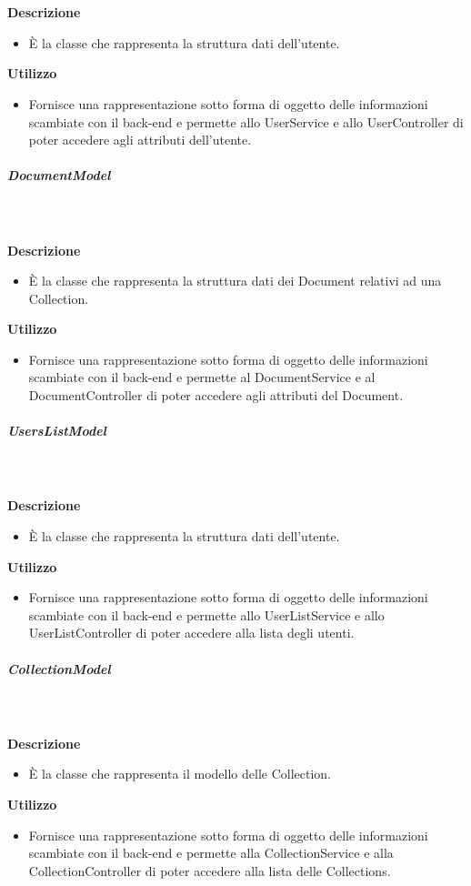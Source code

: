				\textbf{\\ \\ Descrizione} 
					\begin{itemize}
						\item[] È la classe che rappresenta la struttura dati dell'utente.
					\end{itemize}      
				\textbf{Utilizzo}  
					\begin{itemize}
						\item[] Fornisce una rappresentazione sotto forma di oggetto delle informazioni scambiate con il back-end e permette allo UserService e allo UserController di poter accedere agli attributi dell'utente.
					\end{itemize}
			\subparagraph{DocumentModel}
				
				\textbf{\\ \\ Descrizione} 
					\begin{itemize}
						\item[] È la classe che rappresenta la struttura dati dei Document relativi ad una Collection.
					\end{itemize}      
				\textbf{Utilizzo}  
					\begin{itemize}
						\item[] Fornisce una rappresentazione sotto forma di oggetto delle informazioni scambiate con il back-end e permette al DocumentService e al DocumentController di poter accedere agli attributi del Document.
					\end{itemize}
			\subparagraph{UsersListModel}
				
				\textbf{\\ \\ Descrizione} 
					\begin{itemize}
						\item[] È la classe che rappresenta la struttura dati dell'utente.
					\end{itemize}      
				\textbf{Utilizzo}  
					\begin{itemize}
						\item[] Fornisce una rappresentazione sotto forma di oggetto delle informazioni scambiate con il back-end e permette allo UserListService e allo UserListController di poter accedere alla lista degli utenti.
					\end{itemize}
			\subparagraph{CollectionModel}
				
				\textbf{\\ \\ Descrizione} 
					\begin{itemize}
						\item[] È la classe che rappresenta il modello delle Collection.
					\end{itemize}      
				\textbf{Utilizzo}  
					\begin{itemize}
						\item[] Fornisce una rappresentazione sotto forma di oggetto delle informazioni scambiate con il back-end e permette alla CollectionService e alla CollectionController di poter accedere alla lista delle Collections.
					\end{itemize}